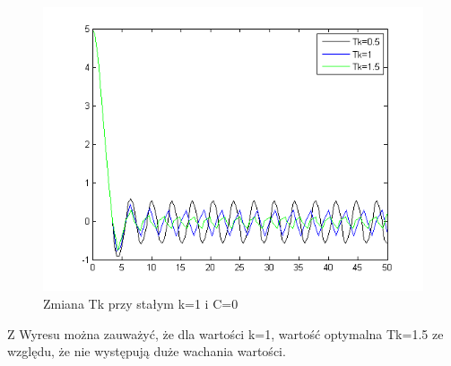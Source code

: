\documentclass[a4paper,10pt]{article}
\begin{document}
\begin{enumerate}
\begin{figure}[!h]
    \centering
	\includegraphics[width=120mm]{CW3-korekcja-dwupolozeniowy-e_Tk.png}
	\caption{Zmiana Tk przy stałym k=1 i C=0}
    \label{fig:Rysunek}
\end{figure}

Z Wyresu można zauważyć, że dla wartości k=1, wartość optymalna Tk=1.5 ze względu, że nie występują duże wachania wartości.


\end{enumerate}
\end{document}
